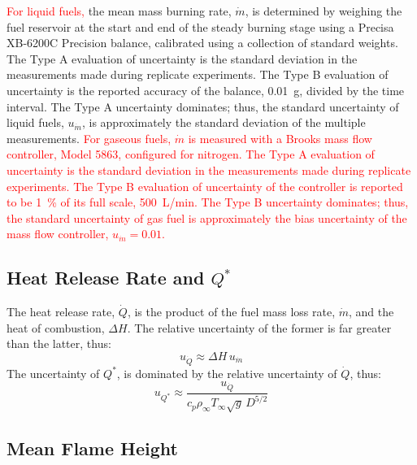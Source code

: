 \documentclass[12pt]{article}
\begin{document}
\textcolor{red}{For liquid fuels,} the mean mass burning rate, $\dot{m}$, is determined by weighing the fuel reservoir at the start and end of the steady burning stage using a Precisa XB-6200C Precision balance, calibrated using a collection of standard weights. The Type A evaluation of uncertainty is the standard deviation in the measurements made during replicate experiments. The Type B evaluation of uncertainty is the reported accuracy of the balance, 0.01~g, divided by the time interval. The Type A uncertainty dominates; thus, the standard uncertainty of liquid fuels, $u_{\scriptscriptstyle \dot{m}}$, is approximately the standard deviation of the multiple measurements. \textcolor{red}{For gaseous fuels, $\dot{m}$ is measured with a Brooks mass flow controller, Model 5863, configured for nitrogen. The Type A evaluation of uncertainty is the standard deviation in the measurements made during replicate experiments. The Type B evaluation of uncertainty of the controller is reported to be 1~\% of its full scale, 500~L/min. The Type B uncertainty dominates; thus, the standard uncertainty of gas fuel is approximately the bias uncertainty of the mass flow controller, $u_{\scriptscriptstyle \dot{m}}=0.01$.}



\subsection{Heat Release Rate and $Q^*$ }
\label{ssec:Heat_Release_Rate}

The heat release rate, $\dot{Q}$, is the product of the fuel mass loss rate, $\dot{m}$, and the heat of combustion, $\Delta H$. The relative uncertainty of the former is far greater than the latter, thus:
\begin{equation}
\label{eq:heat_release_rate_uncertainty}
u_{\scriptscriptstyle \dot{Q}} \approx \Delta H \, u_{\dot{m}}
\end{equation}
The uncertainty of ${Q^*}$, is dominated by the relative uncertainty of $\dot{Q}$, thus:
\begin{equation}
\label{eq:Q*_uncertainty}
u_{\scriptscriptstyle {Q^*}} \approx \frac{u_{\scriptscriptstyle \dot{Q}}}{c_{p}\rho_\infty T_\infty \sqrt{g} \, D^{5/2}}
\end{equation}

\subsection{Mean Flame Height}
\label{ssec:Mean_Flame_Height}
\end{document}
